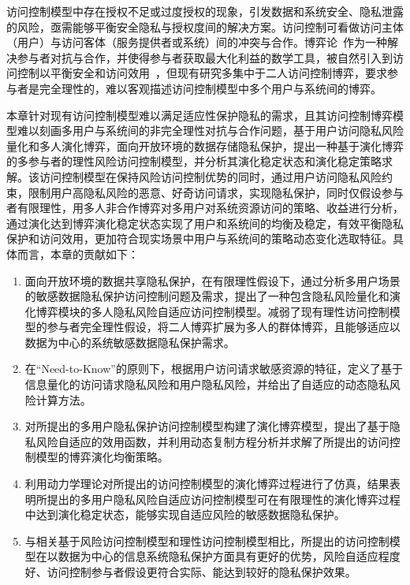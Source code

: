 访问控制模型中存在授权不足或过度授权的现象，引发数据和系统安全、隐私泄露的风险，亟需能够平衡安全隐私与授权度间的解决方案。访问控制可看做访问主体（用户）与访问客体（服务提供者或系统）间的冲突与合作。博弈论~\cite{owen2001game}作为一种解决参与者对抗与合作，并使得参与者获取最大化利益的数学工具，被自然引入到访问控制以平衡安全和访问效用~\cite{helil2017non,gao2018game,wang2019game}，但现有研究多集中于二人访问控制博弈，要求参与者是完全理性的，难以客观描述访问控制模型中多个用户与系统间的博弈。

本章针对现有访问控制模型难以满足适应性保护隐私的需求，且其访问控制博弈模型难以刻画多用户与系统间的非完全理性对抗与合作问题，基于用户访问隐私风险量化和多人演化博弈，面向开放环境的数据存储隐私保护，提出一种基于演化博弈的多参与者的理性风险访问控制模型，并分析其演化稳定状态和演化稳定策略求解。该访问控制模型在保持风险访问控制优势的同时，通过用户访问隐私风险约束，限制用户高隐私风险的恶意、好奇访问请求，实现隐私保护，同时仅假设参与者有限理性，用多人非合作博弈对多用户对系统资源访问的策略、收益进行分析，通过演化达到博弈演化稳定状态实现了用户和系统间的均衡及稳定，有效平衡隐私保护和访问效用，更加符合现实场景中用户与系统间的策略动态变化选取特征。具体而言，本章的贡献如下：
\begin{enumerate}
	\item 面向开放环境的数据共享隐私保护，在有限理性假设下，通过分析多用户场景的敏感数据隐私保护访问控制问题及需求，提出了一种包含隐私风险量化和演化博弈模块的多人隐私风险自适应访问控制模型。减弱了现有理性访问控制模型的参与者完全理性假设，将二人博弈扩展为多人的群体博弈，且能够适应以数据为中心的系统敏感数据隐私保护需求。
	\item 在“Need-to-Know”的原则下，根据用户访问请求敏感资源的特征，定义了基于信息量化的访问请求隐私风险和用户隐私风险，并给出了自适应的动态隐私风险计算方法。
	\item 对所提出的多用户隐私保护访问控制模型构建了演化博弈模型，提出了基于隐私风险自适应的效用函数，并利用动态复制方程分析并求解了所提出的访问控制模型的博弈演化均衡策略。
	\item 利用动力学理论对所提出的访问控制模型的演化博弈过程进行了仿真，结果表明所提出的多用户隐私风险自适应访问控制模型可在有限理性的演化博弈过程中达到演化稳定状态，能够实现自适应风险的敏感数据隐私保护。
	\item 与相关基于风险访问控制模型和理性访问控制模型相比，所提出的访问控制模型在以数据为中心的信息系统隐私保护方面具有更好的优势，风险自适应程度好、访问控制参与者假设更符合实际、能达到较好的隐私保护效果。
\end{enumerate}



